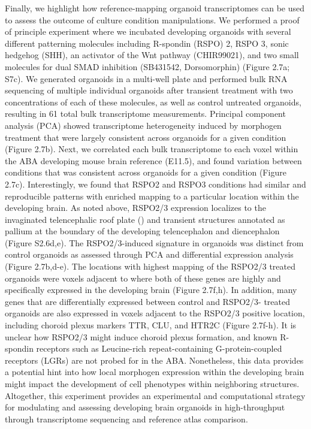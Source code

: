 Finally, we highlight how reference-mapping organoid transcriptomes can be used to assess the outcome of culture condition manipulations. We performed a proof of principle experiment where we incubated developing organoids with several different patterning molecules including R-spondin (RSPO) 2, RSPO 3, sonic hedgehog (SHH), an activator of the Wnt pathway (CHIR99021), and two small molecules for dual SMAD inhibition (SB431542, Dorsomorphin) (Figure 2.7a; S7c). We generated organoids in a multi-well plate and performed bulk RNA sequencing of multiple individual organoids after transient treatment with two concentrations of each of these molecules, as well as control untreated organoids, resulting in 61 total bulk transcriptome measurements. Principal component analysis (PCA) showed transcriptome heterogeneity induced by morphogen treatment that were largely consistent across organoids for a given condition (Figure 2.7b). Next, we correlated each bulk transcriptome to each voxel within the ABA developing mouse brain reference (E11.5), and found variation between conditions that was consistent across organoids for a given condition (Figure 2.7c). Interestingly, we found that RSPO2 and RSPO3 conditions had similar and reproducible patterns with enriched mapping to a particular location within the developing brain. As noted above, RSPO2/3 expression localizes to the invaginated telencephalic roof plate (\cite{kamata_r-spondin_2004}) and transient structures annotated as pallium at the boundary of the developing telencephalon and diencephalon (Figure S2.6d,e). The RSPO2/3-induced signature in organoids was distinct from control organoids as assessed through PCA and differential expression analysis (Figure 2.7b,d-e). The locations with highest mapping of the RSPO2/3 treated organoids were voxels adjacent to where both of these genes are highly and specifically expressed in the developing brain (Figure 2.7f,h). In addition, many genes that are differentially expressed between control and RSPO2/3- treated organoids are also expressed in voxels adjacent to the RSPO2/3 positive location, including choroid plexus markers TTR, CLU, and HTR2C (Figure 2.7f-h). It is unclear how RSPO2/3 might induce choroid plexus formation, and known R-spondin receptors such as Leucine-rich repeat-containing G-protein-coupled receptors (LGRs) are not probed for in the ABA. Nonetheless, this data provides a potential hint into how local morphogen expression within the developing brain might impact the development of cell phenotypes within neighboring structures. Altogether, this experiment provides an experimental and computational strategy for modulating and assessing developing brain organoids in high-throughput through transcriptome sequencing and reference atlas comparison.


